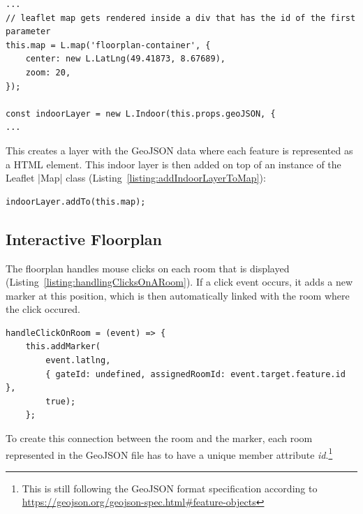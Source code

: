\begin{lstlisting}[label={listing:setupMapFromGeoJSON},caption={Setup map from GeoJSON data}]
...
// leaflet map gets rendered inside a div that has the id of the first parameter
this.map = L.map('floorplan-container', {
	center: new L.LatLng(49.41873, 8.67689),
	zoom: 20,
});

const indoorLayer = new L.Indoor(this.props.geoJSON, {
...
\end{lstlisting}

This creates a layer with the GeoJSON data where each feature is represented as a HTML element.
This indoor layer is then added on top of an instance of the  Leaflet |Map|\cite{leaflet:map} class (Listing~\ref{listing:addIndoorLayerToMap}):

\begin{lstlisting}[label={listing:addIndoorLayerToMap},caption={Adding indoor layer to map}]
indoorLayer.addTo(this.map);
\end{lstlisting}



\subsection{Interactive Floorplan}
\label{Interactive Floorplan}

The floorplan handles mouse clicks on each room that is displayed (Listing~\ref{listing:handlingClicksOnARoom}). If a click event occurs, it adds a new marker at this position, which is then automatically linked with the room where the click occured.

\begin{lstlisting}[label={listing:handlingClicksOnARoom},caption={Handling clicks on a room}]
handleClickOnRoom = (event) => {
	this.addMarker(
		event.latlng, 
		{ gateId: undefined, assignedRoomId: event.target.feature.id }, 
		true);
	};
\end{lstlisting}

To create this connection between the room and the marker, each room represented in the GeoJSON file has to have a unique member attribute \emph{id}.\footnote{This is still following the GeoJSON format specification according to \url{https://geojson.org/geojson-spec.html\#feature-objects}}

